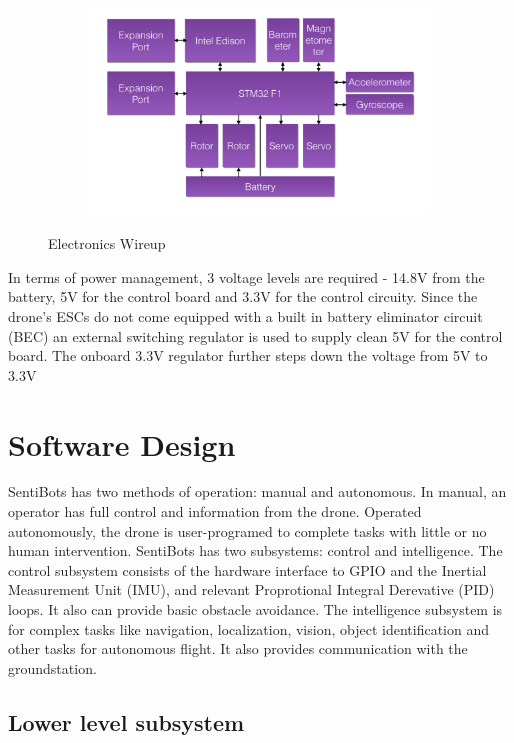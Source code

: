 \documentclass[12pt]{article}
\begin{document}
\begin{figure}[h]
	\centering
	\begin{subfigure}{\textwidth}
		\centering
		\includegraphics[width=\linewidth]{framework.png}
	\end{subfigure}
	\caption{Electronics Wireup}
	\label{fig:electronics}
\end{figure} 

In terms of power management, 3 voltage levels are required - 14.8V from the battery, 5V for the control board and 3.3V for the control circuity. Since the drone’s ESCs do not come equipped with a built in battery eliminator circuit (BEC) an external switching regulator is used to supply clean 5V for the control board. The onboard 3.3V regulator further steps down the voltage from 5V to 3.3V

\section{Software Design}

SentiBots has two methods of operation: manual and autonomous. In manual, an operator has full control and information from the drone. Operated autonomously, the drone is user-programed to complete tasks with little or no human intervention. SentiBots has two subsystems: control and intelligence. The control subsystem consists of the hardware interface to GPIO and the Inertial Measurement Unit (IMU), and relevant Proprotional Integral Derevative (PID) loops. It also can provide basic obstacle avoidance. The intelligence subsystem is for complex tasks like navigation, localization, vision, object identification and other tasks for autonomous flight. It also provides communication with the groundstation.

\subsection{Lower level subsystem}
\end{document}
